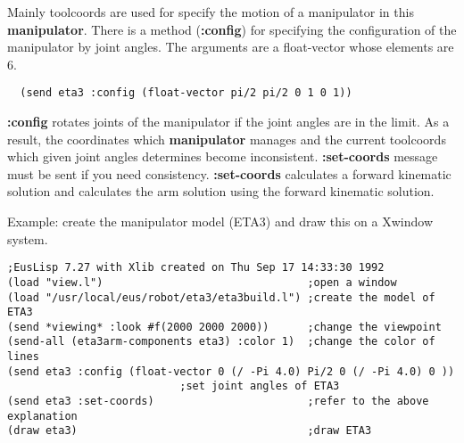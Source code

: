 
Mainly toolcoords are used for specify the motion of a manipulator in 
this {\bf manipulator}. There is a method ({\bf :config}) for specifying the 
configuration of the manipulator by joint angles. The arguments are a 
float-vector whose elements are 6.


\begin{verbatim}
  (send eta3 :config (float-vector pi/2 pi/2 0 1 0 1))
\end{verbatim}

{\bf :config} rotates joints of the manipulator if the joint angles are in the 
limit. As a result, the coordinates which {\bf manipulator} manages and the 
current toolcoords which given joint angles determines become inconsistent.
{\bf :set-coords} message must be sent if you need consistency. {\bf :set-coords}
calculates a forward kinematic solution and calculates the arm solution using the 
forward kinematic solution.



Example: create the manipulator model (ETA3) and draw this on a Xwindow system.
\begin{verbatim}
;EusLisp 7.27 with Xlib created on Thu Sep 17 14:33:30 1992
(load "view.l")                                ;open a window
(load "/usr/local/eus/robot/eta3/eta3build.l") ;create the model of ETA3
(send *viewing* :look #f(2000 2000 2000))      ;change the viewpoint
(send-all (eta3arm-components eta3) :color 1)  ;change the color of lines
(send eta3 :config (float-vector 0 (/ -Pi 4.0) Pi/2 0 (/ -Pi 4.0) 0 ))
					       ;set joint angles of ETA3
(send eta3 :set-coords)                        ;refer to the above explanation
(draw eta3)                                    ;draw ETA3
\end{verbatim}


